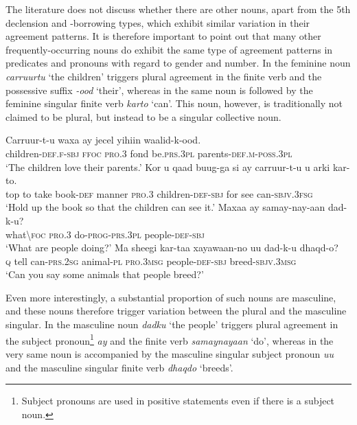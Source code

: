 \documentclass[output=paper]{langsci/langscibook}
\begin{document}
The literature does not discuss whether there are other nouns, apart from the 5th declension and -borrowing types, which exhibit similar variation in their agreement patterns. It is therefore important to point out that many other frequently-occurring nouns do exhibit the same type of agreement patterns in predicates and pronouns with regard to gender and number. In  the feminine noun \textit{carruurtu} ‘the children’ triggers plural agreement in the finite verb and the possessive suffix \textit{-ood} ‘their’, whereas in  the same noun is followed by the feminine singular finite verb \textit{karto} ‘can’. This noun, however, is traditionally not claimed to be plural, but instead to be a singular collective noun.

\ea\label{ex:nilsson:3}
\ea\label{ex:nilsson:3a}
\gll Carruur-t-u          waxa ay      jecel  yihiin           waalid-k-ood.\\
       children-\textsc{def.f-sbj} \textsc{ffoc} \textsc{pro.3} fond  be.\textsc{prs.3pl} parents-\textsc{def.m}-\textsc{poss.3pl}\\
\glt ‘The children love their parents.’
\ex\label{ex:nilsson:3b}
\gll Kor u qaad buug-ga  si          ay      carruur-t-u          u   arki kar-to.\\
     top to take book-\textsc{def} manner \textsc{pro.3} children-\textsc{def-sbj} for see can-\textsc{sbjv.3fsg}\\
\glt ‘Hold up the book so that the children can see it.’
\ex\label{ex:nilsson:3c}
\gll Maxaa     ay          samay-nay-aan     dad-k-u?\\
       what{\textbackslash}\textsc{foc} \textsc{pro.3}  do-\textsc{prog-prs.3pl}  people\textsc{-def-sbj}\\
\glt ‘What are people doing?’
\ex\label{ex:nilsson:3d}
\gll Ma sheegi kar-taa         xayawaan-no  uu        dad-k-u             dhaqd-o?\\
       \textsc{q}     tell     can-\textsc{prs.2sg} animal\textsc{-pl}  \textsc{pro.3msg}  people\textsc{-def-sbj} breed-\textsc{sbjv.3msg}\\
\glt ‘Can you say some animals that people breed?’
\z
\z

Even more interestingly, a substantial proportion of such nouns are masculine, and these nouns therefore trigger variation between the plural and the masculine singular. In  the masculine noun \textit{dadku} ‘the people’ triggers plural agreement in the subject pronoun\footnote{Subject pronouns are used in positive statements even if there is a subject noun.} \textit{ay} and the finite verb \textit{samaynayaan} ‘do’, whereas in  the very same noun is accompanied by the masculine singular subject pronoun \textit{uu} and the masculine singular finite verb \textit{dhaqdo} ‘breeds’. 
\end{document}
